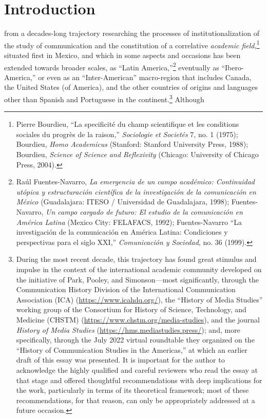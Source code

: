 \documentclass{tufte-handout}
\begin{document}

\hypertarget{introduction}{%
\section{Introduction}\label{introduction}}

 from a decades-long trajectory researching the
processes of institutionalization of the study of communication and the
constitution of a correlative \emph{academic field,}\footnote{Pierre
  Bourdieu, ``La specificité du champ scientifique et les conditions
  sociales du progrès de la raison,'' \emph{Sociologie} \emph{et}
  \emph{Societés} 7, no. 1 (1975); Bourdieu, \emph{Homo Academicus}
  (Stanford: Stanford University Press, 1988); Bourdieu, \emph{Science
  of Science and Reflexivity} (Chicago: University of Chicago Press, 2004).} situated first in Mexico, and which in some aspects and
occasions has been extended towards broader scales, as ``Latin
America,''\footnote{Raúl Fuentes-Navarro, \emph{La emergencia de un
  campo académico: Continuidad utópica y estructuración científica de la
  investigación de la comunicación en México} (Guadalajara: ITESO /
  Universidad de Guadalajara, 1998); Fuentes-Navarro, \emph{Un campo
  cargado de futuro: El estudio de la comunicación en América Latina}
  (Mexico City: FELAFACS, 1992); Fuentes-Navarro ``La investigación de
  la comunicación en América Latina: Condiciones y perspectivas para el
  siglo XXI,'' \emph{Comunicación y Sociedad}, no. 36 (1999).}
eventually as ``Ibero-America,'' or even as an ``Inter-American''
macro-region that includes Canada, the United States (of America), and
the other countries of origins and languages other than Spanish and
Portuguese in the continent.\footnote{During the most recent decade,
  this trajectory has found great stimulus and impulse in the context of
  the international academic community developed on the initiative of
  Park, Pooley, and Simonson---most significantly, through the Communication History Division
  of the International Communication Association (ICA)
  (\url{https://www.icahdq.org/}), the ``History of Media Studies''
  working group of the Consortium for History of Science, Technology,
  and Medicine (CHSTM) (\url{https://www.chstm.org/media-studies}), and
  the journal \emph{History of Media Studies}
  (\url{https://hms.mediastudies.press/}); and, more specifically,
  through the July 2022 virtual roundtable they organized on the
  ``History of Communication Studies in the Americas,'' at which an
  earlier draft of this essay was presented. It is important for the
  author to acknowledge the highly qualified and careful reviewers who
  read the essay at that stage and offered thoughtful recommendations
  with deep implications for the work, particularly in terms of its
  theoretical framework; most of these recommendations, for that reason,
  can only be appropriately addressed at a future occasion.} Although
\end{document}
